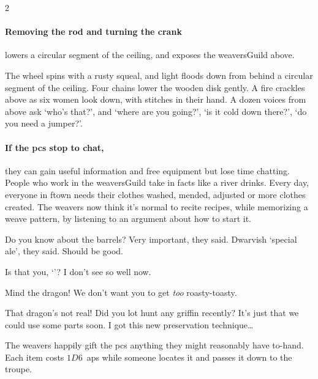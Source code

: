 \begin{multicols}{2}
\paragraph{Removing the rod and turning the crank}
lowers a circular segment of the ceiling, and exposes the \gls{weaversGuild} above.

\begin{boxtext}
  The wheel spins with a rusty squeal, and light floods down from behind a circular segment of the ceiling.
  Four chains lower the wooden disk gently.
  A fire crackles above as six women look down, with stitches in their hand.
  A dozen voices from above ask `who's that?', and `where are you going?', `is it cold down there?', `do you need a jumper?'.
\end{boxtext}

\paragraph{If the \glspl{pc} stop to chat,}
they can gain useful information and free \gls{equipment} but lose time chatting.
People who work in the \gls{weaversGuild} take in facts like a river drinks.
Every day, everyone in \gls{ftown} needs their clothes washed, mended, adjusted or more clothes created.
The \glspl{weaver} now think it's normal to recite recipes, while memorizing a weave pattern, by listening to an argument about how to start it.

\begin{speechtext}

  Do you know about the barrels?
  Very important, they said.
  Dwarvish `special ale', they said.
  Should be good.

  {\small
    Is that you, `\composeHumanName'?
    I don't see so well now.
  }

  \vspace{-.5em}
  {\large
    Mind the dragon!
    We don't want you to get \emph{too} roasty-toasty.
  }

  That dragon's not real!
  Did you lot hunt any \gls{griffin} recently?
  It's just that we could use some parts soon.
  I got this new preservation technique\ldots

  \vspace{-.3em}
\end{speechtext}

The \glspl{weaver} happily gift the \glspl{pc} anything they might reasonably have to-hand.
Each item costs $1D6$~\glspl{ap} while someone locates it and passes it down to the troupe.


\end{multicols}
